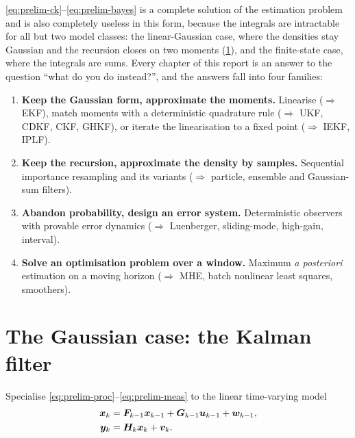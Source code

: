 \eqref{eq:prelim-ck}--\eqref{eq:prelim-bayes} is a complete solution of the estimation problem
and is also completely useless in this form, because the integrals are intractable for all but
two model classes: the linear-Gaussian case, where the densities stay Gaussian and the recursion
closes on two moments (\cref{sec:prelim-kf}), and the finite-state case, where the integrals are
sums. Every chapter of this report is an answer to the question ``what do you do instead?'', and
the answers fall into four families:
\begin{enumerate}[nosep,leftmargin=*]
\item \textbf{Keep the Gaussian form, approximate the moments.} Linearise ($\Rightarrow$ EKF),
  match moments with a deterministic quadrature rule ($\Rightarrow$ UKF, CDKF, CKF, GHKF), or
  iterate the linearisation to a fixed point ($\Rightarrow$ IEKF, IPLF).
\item \textbf{Keep the recursion, approximate the density by samples.} Sequential importance
  resampling and its variants ($\Rightarrow$ particle, ensemble and Gaussian-sum filters).
\item \textbf{Abandon probability, design an error system.} Deterministic observers with
  provable error dynamics ($\Rightarrow$ Luenberger, sliding-mode, high-gain, interval).
\item \textbf{Solve an optimisation problem over a window.} Maximum \emph{a posteriori}
  estimation on a moving horizon ($\Rightarrow$ MHE, batch nonlinear least squares, smoothers).
\end{enumerate}

\section{The Gaussian case: the Kalman filter}
\label{sec:prelim-kf}

Specialise \eqref{eq:prelim-proc}--\eqref{eq:prelim-meas} to the linear time-varying model
\begin{align}
\bm{x}_k &= \bm{F}_{k-1}\bm{x}_{k-1} + \bm{G}_{k-1}\bm{u}_{k-1} + \bm{w}_{k-1}, \label{eq:prelim-lin-proc}\\
\bm{y}_k &= \bm{H}_k\bm{x}_k + \bm{v}_k. \label{eq:prelim-lin-meas}
\end{align}


